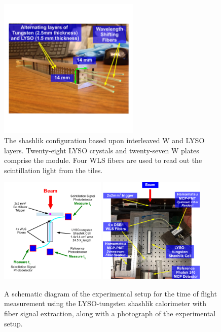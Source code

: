 \documentclass[12pt]{article}
\begin{document}
{\begin{figure}[H] \centering
\includegraphics[width=0.6\textwidth]{figs/ShashlikCellPhoto.pdf} 
\caption{ The shashlik configuration based upon interleaved W and LYSO layers. 
Twenty-eight LYSO crystals and twenty-seven W plates comprise the module.
Four WLS fibers are used to read out the scintillation light from the 
tiles. } 
\label{fig:ShashlikDiagram}
\end{figure}

\begin{figure}[H] \centering
\includegraphics[width=0.45\textwidth]{figs/ShashlikFiberSetupSchematic} 
\includegraphics[width=0.45\textwidth]{figs/ShashlikFiberSetupPhoto} 
\caption{ A schematic diagram of the experimental setup for the
time of flight measurement using the LYSO-tungsten shashlik calorimeter
with fiber signal extraction, along with a photograph of the
experimental setup. } 
\label{fig:ShashlikFiberSetup}
\end{figure}

}
\end{document}
